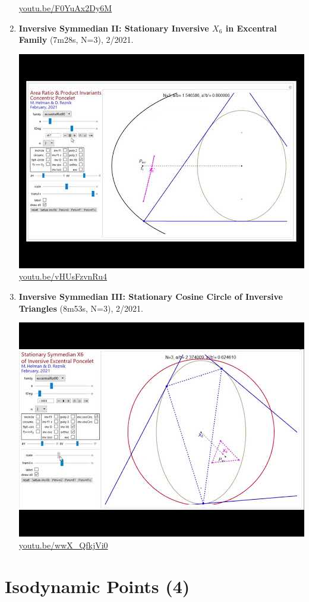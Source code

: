 \documentclass[12pt]{amsart}
\begin{document}
\begin{enumerate}[resume]
\begin{center}
\href{https://youtu.be/F0YuAx2Dy6M}{\url{youtu.be/F0YuAx2Dy6M}}\end{center}
% 
\item \textbf{Inversive Symmedian II: Stationary Inversive $X_{6}$ in Excentral Family} (7m28s, N=3), 2/2021. 
\begin{center}\includegraphics[width=.5\textwidth]{pics/vHUsFzvnRu4.jpg} \\ 
\href{https://youtu.be/vHUsFzvnRu4}{\url{youtu.be/vHUsFzvnRu4}}\end{center}
% 
\item \textbf{Inversive Symmedian III: Stationary Cosine Circle of Inversive Triangles} (8m53s, N=3), 2/2021. 
\begin{center}\includegraphics[width=.5\textwidth]{pics/wwX_QfkjVi0.jpg} \\ 
\href{https://youtu.be/wwX_QfkjVi0}{\url{youtu.be/wwX\_QfkjVi0}}\end{center}
% 
\end{enumerate}

\section{Isodynamic Points (4)}
\end{document}
